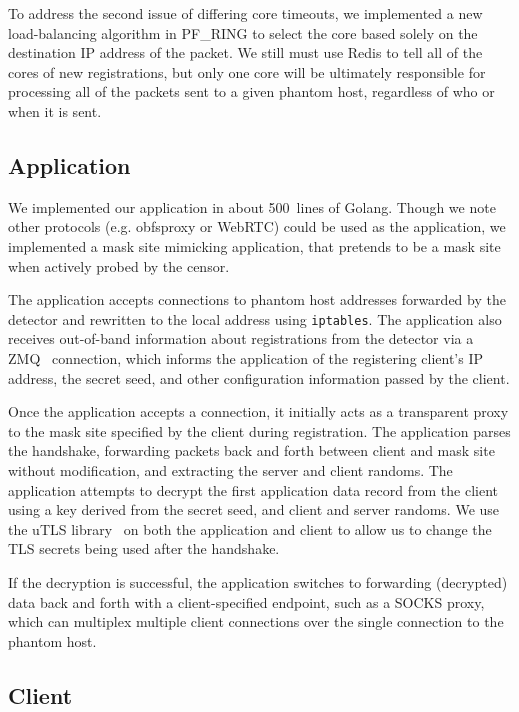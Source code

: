 \documentclass[sigconf]{acmart}
\begin{document}
To address the second issue of differing core timeouts, we implemented a new
load-balancing algorithm in
PF\_RING to select the core based solely on the destination IP address of the
packet. We still must use Redis to tell all of the cores of new
registrations, but only one core will be ultimately responsible for processing all of
the packets sent to a given phantom host, regardless of who or when it is sent.


\subsection{Application}

We implemented our application in about 500~lines of Golang. Though we note
other protocols (e.g. obfsproxy or WebRTC) could be used as the application, we
implemented a mask site mimicking application, that pretends to be a mask site
when actively probed by the censor.

The application accepts connections to phantom host addresses forwarded by the
detector and rewritten to the local address using \texttt{iptables}.
The application also receives out-of-band information about registrations from the
detector via a ZMQ~\cite{zmq} connection, which informs the application of the
registering client's IP address, the secret seed, and other configuration
information passed by the client.

Once the application accepts a connection, it initially acts as a transparent
proxy to the mask site specified by the client during registration. The
application parses the handshake, forwarding packets back and forth between
client and mask site without modification, and extracting the server and client
randoms. The application attempts to decrypt the first application data record
from the client using a key derived from the secret seed, and client and server
randoms. We use the uTLS library~\cite{utls} on both the application and client
to allow us to change the TLS secrets being used after the handshake.

\FigTapBandwidth

If the decryption is successful, the application switches to forwarding
(decrypted) data back and forth with a client-specified endpoint, such as a
SOCKS proxy, which can multiplex multiple client connections over the single
connection to the phantom host.

\subsection{Client}
\end{document}
